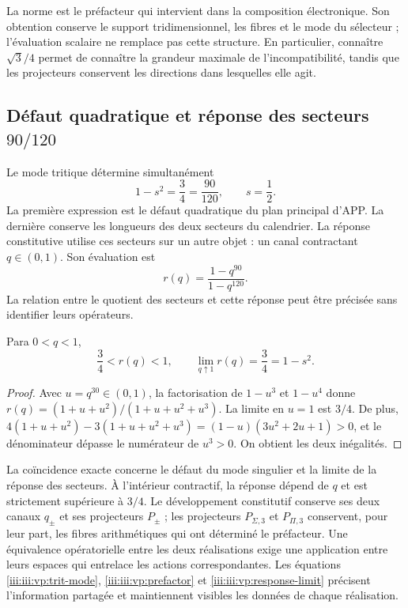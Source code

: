 La norme est le préfacteur qui intervient dans la composition électronique.
Son obtention conserve le support tridimensionnel, les fibres et le mode
du sélecteur ; l’évaluation scalaire ne remplace pas cette structure. En
particulier, connaître $\sqrt3/4$ permet de connaître la grandeur maximale de
l’incompatibilité, tandis que les projecteurs conservent les directions
dans lesquelles elle agit.

\clearpage
\subsection{Défaut quadratique et réponse des secteurs \(90/120\)}

Le mode tritique détermine simultanément
\begin{equation}
 1-s^2=\frac34=\frac{90}{120},\qquad s=\frac12.
 \label{iii:iii:vp:defect-ratio}
\end{equation}
La première expression est le défaut quadratique du plan principal d'APP. La dernière conserve les longueurs des deux secteurs du calendrier. La réponse constitutive utilise ces secteurs sur un autre objet : un canal contractant $q\in(0,1)$. Son évaluation est
\[
 r(q)=\frac{1-q^{90}}{1-q^{120}}.
\]
La relation entre le quotient des secteurs et cette réponse peut être
précisée sans identifier leurs opérateurs.

\begin{proposition}
Para $0<q<1$,
\begin{equation}
 \frac34<r(q)<1,\qquad
 \lim_{q\uparrow1}r(q)=\frac34=1-s^2.
 \label{iii:iii:vp:response-limit}
\end{equation}
\end{proposition}
\begin{proof}
Avec $u=q^{30}\in(0,1)$, la factorisation de $1-u^3$ et
$1-u^4$ donne
$r(q)=(1+u+u^2)/(1+u+u^2+u^3)$. La limite en $u=1$ est
$3/4$. De plus,
$4(1+u+u^2)-3(1+u+u^2+u^3)
=(1-u)(3u^2+2u+1)>0$, et le dénominateur dépasse le numérateur
de $u^3>0$. On obtient les deux inégalités.
\end{proof}

La coïncidence exacte concerne le défaut du mode singulier et la limite
de la réponse des secteurs. À l’intérieur contractif, la réponse
dépend de $q$ et est strictement supérieure à $3/4$. Le développement
constitutif conserve ses deux canaux $q_\pm$ et ses projecteurs
$P_\pm$ ; les projecteurs $P_{\Sigma,3}$ et $P_{\Pi,3}$ conservent,
pour leur part, les fibres arithmétiques qui ont déterminé le préfacteur.
Une équivalence opératorielle entre les deux réalisations exige une application
entre leurs espaces qui entrelace les actions correspondantes.
Les équations \eqref{iii:iii:vp:trit-mode}, \eqref{iii:iii:vp:prefactor} et
\eqref{iii:iii:vp:response-limit} précisent l’information partagée et
maintiennent visibles les données de chaque réalisation.
